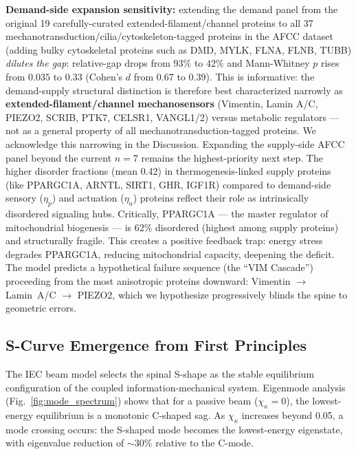 \textbf{Demand-side expansion sensitivity:} extending the demand panel from the original 19 carefully-curated extended-filament/channel proteins to all 37 mechanotransduction/cilia/cytoskeleton-tagged proteins in the AFCC dataset (adding bulky cytoskeletal proteins such as DMD, MYLK, FLNA, FLNB, TUBB) \emph{dilutes the gap}: relative-gap drops from $93\%$ to $42\%$ and Mann-Whitney $p$ rises from $0.035$ to $0.33$ (Cohen's $d$ from $0.67$ to $0.39$). This is informative: the demand-supply structural distinction is therefore best characterized narrowly as \textbf{extended-filament/channel mechanosensors} (Vimentin, Lamin A/C, PIEZO2, SCRIB, PTK7, CELSR1, VANGL1/2) versus metabolic regulators --- not as a general property of all mechanotransduction-tagged proteins. We acknowledge this narrowing in the Discussion. Expanding the supply-side AFCC panel beyond the current $n = 7$ remains the highest-priority next step. The higher disorder fractions (mean 0.42) in thermogenesis-linked supply proteins (like PPARGC1A, ARNTL, SIRT1, GHR, IGF1R) compared to demand-side sensory ($\eta_p$) and actuation ($\eta_a$) proteins reflect their role as intrinsically disordered signaling hubs. Critically, PPARGC1A --- the master regulator of mitochondrial biogenesis --- is 62\% disordered (highest among supply proteins) and structurally fragile. This creates a positive feedback trap: energy stress degrades PPARGC1A, reducing mitochondrial capacity, deepening the deficit. The model predicts a hypothetical failure sequence (the ``VIM Cascade'') proceeding from the most anisotropic proteins downward: Vimentin $\to$ Lamin~A/C $\to$ PIEZO2, which we hypothesize progressively blinds the spine to geometric errors.

\subsection{S-Curve Emergence from First Principles}

The IEC beam model selects the spinal S-shape as the stable equilibrium configuration of the coupled information-mechanical system. Eigenmode analysis (Fig.~\ref{fig:mode_spectrum}) shows that for a passive beam ($\chi_\kappa = 0$), the lowest-energy equilibrium is a monotonic C-shaped sag. As $\chi_\kappa$ increases beyond 0.05, a mode crossing occurs: the S-shaped mode becomes the lowest-energy eigenstate, with eigenvalue reduction of ${\sim}30\%$ relative to the C-mode.

